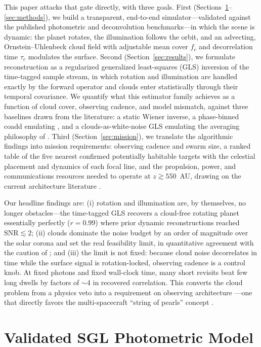﻿\documentclass[twocolumn,10pt]{article}
\begin{document}
This paper attacks that gate directly, with three goals. First
(Sections~\ref{sec:model}--\ref{sec:methods}), we build a transparent,
end-to-end simulator---validated against the published photometric and
deconvolution benchmarks---in which the scene is dynamic: the planet
rotates, the illumination follows the orbit, and an advecting,
Ornstein--Uhlenbeck cloud field with adjustable mean cover $f_c$ and
decorrelation time $\tau_c$ modulates the surface. Second
(Section~\ref{sec:results}), we formulate reconstruction as a regularized
generalized least-squares (GLS) inversion of the time-tagged sample
stream, in which rotation and illumination are handled exactly by the
forward operator and clouds enter statistically through their temporal
covariance. We quantify what this estimator family achieves as a
function of cloud cover, observing cadence, and model mismatch, against
three baselines drawn from the literature: a static Wiener inverse, a
phase-binned coadd emulating \citet{tur26bench}, and a
clouds-as-white-noise GLS emulating the averaging philosophy of
\citet{toth25clouds}. Third (Section~\ref{sec:mission}), we translate the
algorithmic findings into mission requirements: observing cadence and
swarm size, a ranked table of the five nearest confirmed potentially
habitable targets with the celestial placement and dynamics of each
focal line, and the propulsion, power, and communications resources
needed to operate at $z\gtrsim550$~AU, drawing on the current
architecture literature \citep{niac20,helvajian23,friedman24,tur26prop}.

Our headline findings are: (i) rotation and illumination are, by
themselves, no longer obstacles---the time-tagged GLS recovers a
cloud-free rotating planet essentially perfectly ($r=0.99$) where prior
dynamic reconstructions reached $\mathrm{SNR}\lesssim2$; (ii) clouds
dominate the noise budget by an order of magnitude over the solar corona
and set the real feasibility limit, in quantitative agreement with the
caution of \citet{toth25clouds}; and (iii) the limit is not fixed: because
cloud noise decorrelates in time while the surface signal is
rotation-locked, observing cadence is a control knob. At fixed photons
and fixed wall-clock time, many short revisits beat few long dwells by
factors of $\sim$4 in recovered correlation. This converts the cloud
problem from a physics veto into a requirement on observing architecture
---one that directly favors the multi-spacecraft ``string of pearls''
concept \citep{helvajian23}.

\section{Validated SGL Photometric Model}
\label{sec:model}
\end{document}
